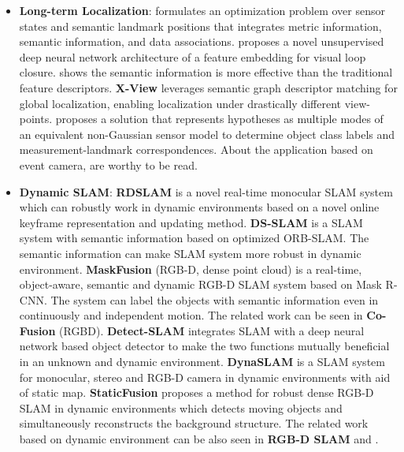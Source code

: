 \documentclass[journal,transmag]{IEEEtran}
\begin{document}
\begin{itemize}
    \item \textbf{Long-term Localization}: \cite{Bowman2017Probabilistic} formulates an optimization problem over sensor states and semantic landmark positions that integrates metric information, semantic information, and data associations. \cite{merrill2018lightweight} proposes a novel unsupervised deep neural network architecture of a feature embedding for visual loop closure. \cite{Stenborg2018Long} shows the semantic information is more effective than the traditional feature descriptors. \textbf{X-View} \cite{gawel2018x} leverages semantic graph descriptor matching for global localization, enabling localization under drastically different view-points. \cite{doherty2019multimodal} proposes a solution that represents hypotheses as multiple modes of an equivalent non-Gaussian sensor model to determine object class labels and measurement-landmark correspondences. About the application based on event camera, \cite{censi2013low} are worthy to be read. 
    \item \textbf{Dynamic SLAM}: \textbf{RDSLAM} \cite{tan2013robust}  is a novel real-time monocular SLAM system which can robustly work in dynamic environments based on a novel online keyframe representation and updating method. \textbf{DS-SLAM} \cite{yu2018ds} is a SLAM system with semantic information based on optimized ORB-SLAM. The semantic information can make SLAM system more robust in dynamic environment. \textbf{MaskFusion} (RGB-D, dense point cloud) is a real-time, object-aware, semantic and dynamic RGB-D SLAM system \cite{8613746} based on Mask R-CNN\cite{matterport_maskrcnn_2017}. The system can label the objects with semantic information even in continuously and independent motion. The related work can be seen in \textbf{Co-Fusion} (RGBD)\cite{runz2017co}.  \textbf{Detect-SLAM} \cite{Zhong2018Detect} integrates SLAM with a deep neural network based object detector to make the two functions mutually beneficial in an unknown and dynamic environment. \textbf{DynaSLAM} \cite{bescos2018dynaslam} is a SLAM system for monocular, stereo and RGB-D camera in dynamic environments with aid of static map. \textbf{StaticFusion} \cite{scona2018staticfusion} proposes a method for robust dense RGB-D SLAM in dynamic environments which detects moving objects and simultaneously reconstructs the background structure. The related work based on dynamic environment can be also seen in \textbf{RGB-D SLAM}\cite{dai2018rgb} and \cite{wang2019computationally}\cite{xiao2019dynamic}\cite{barsan2018robust}.
\end{itemize}
\end{document}
